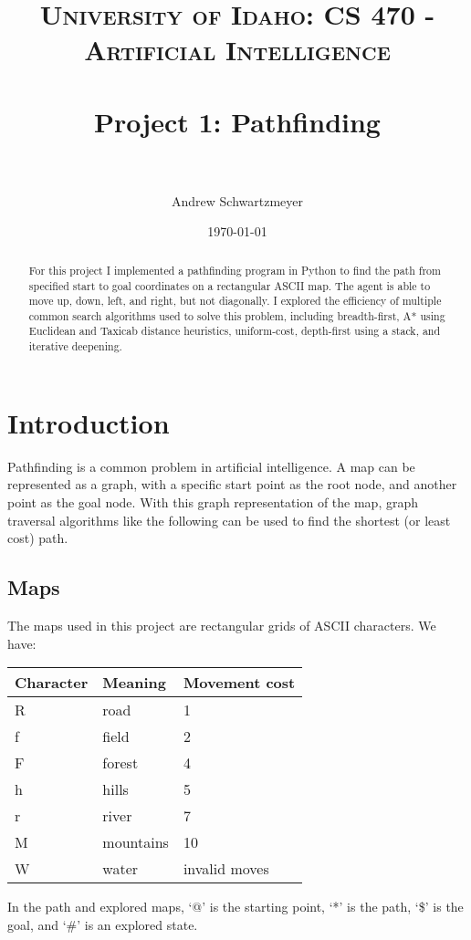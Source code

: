 \documentclass[12pt, article]{scrartcl}
\title{	
\normalfont \normalsize 
\textsc{University of Idaho: CS 470 - Artificial Intelligence} \\ [25pt]
\horrule{0.5pt} \\[0.4cm]
\huge Project 1: Pathfinding\\
\horrule{2pt} \\[0.5cm]
}
\author{Andrew Schwartzmeyer}
\date{\normalsize\today}
\begin{document}
\maketitle %
\begin{abstract}
For this project I implemented a pathfinding program in Python to find the path from specified start to goal coordinates on a rectangular ASCII map. The agent is able to move up, down, left, and right, but not diagonally. I explored the efficiency of multiple common search algorithms used to solve this problem, including breadth-first, A* using Euclidean and Taxicab distance heuristics, uniform-cost, depth-first using a stack, and iterative deepening. \\
\end{abstract}
\pagebreak
\section{Introduction}
Pathfinding is a common problem in artificial intelligence. A map can be represented as a graph, with a specific start point as the root node, and another point as the goal node. With this graph representation of the map, graph traversal algorithms like the following can be used to find the shortest (or least cost) path. \\
\subsection{Maps}
The maps used in this project are rectangular grids of ASCII characters. We have: \\
\begin{center}
\begin{tabular}{l | l | l}
Character & Meaning & Movement cost \\ \hline
R & road & 1 \\
f & field & 2 \\
F & forest & 4 \\
h & hills & 5 \\
r & river & 7 \\
M & mountains & 10 \\
W & water & invalid moves \\
\end{tabular}
\end{center}

In the path and explored maps, `@' is the starting point, `*' is the path, `\$' is the goal, and `\#' is an explored state. \\ 
\end{document}

